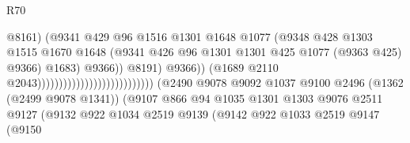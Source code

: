 \begin{lexlean}{R70}
\begin{coremodule}
                                                                  @8161)
                                                                (@9341
                                                                  @429
                                                                  @96
                                                                  @1516
                                                                  @1301
                                                                  @1648
                                                                  @1077
                                                                  (@9348
                                                                    @428
                                                                    @1303
                                                                    @1515
                                                                    @1670
                                                                    @1648
                                                                    (@9341
                                                                      @426
                                                                      @96
                                                                      @1301
                                                                      @1301
                                                                      @425
                                                                      @1077
                                                                      (@9363 @425)
                                                                      @9366)
                                                                    @1683)
                                                                  @9366))
                                                              @8191)
                                                            @9366))
                                                        (@1689
                                                          @2110
                                                          @2043)))))))))))))))))))))))))))
    (@2490
      @9078
      @9092
      @1037
      @9100
      @2496
      (@1362 (@2499 @9078 @1341))
      (@9107
        @866
        @94
        @1035
        @1301
        @1303
        @9076
        @2511
        @9127
        (@9132
          @922
          @1034
          @2519
          @9139
          (@9142
            @922
            @1033
            @2519
            @9147
            (@9150

\end{coremodule}
\end{lexlean}
